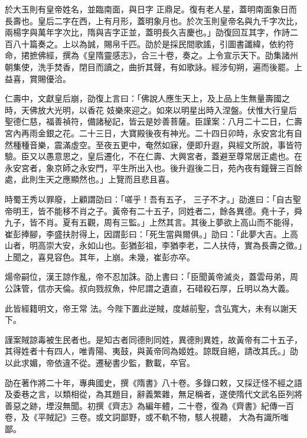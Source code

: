 \begin{pinyinscope}
 於大玉則有皇帝姓名，並臨南面，與日字
 正鼎足。復有老人星，蓋明南面象日而長壽也。皇后二字在西，上有月形，蓋明象月也。於次玉則皇帝名與九千字次比，兩楊字與萬年字次比，隋與吉字正並，蓋明長久吉慶也。」劭復回互其字，作詩二百八十篇奏之。上以為誠，賜帛千匹。劭於是採民間歌謠，引圖書讖緯，依約符命，捃摭佛經，撰為《皇隋靈感志》，合三十卷，奏之。上令宣示天下。劭集諸州朝集使，洗手焚香，閉目而讀之，曲折其聲，有如歌詠。經涉旬朔，遍而後罷。上益喜，賞賜優洽。



 仁壽中，文獻皇后崩，劭復上言曰：「佛說人應生天上，及上品上生無量壽國之時，天佛放大光明，以香花
 妓樂來迎之。如來以明星出時入涅盤。伏惟大行皇后聖德仁慈，福善禎符，備諸秘記，皆云是妙善菩薩。臣謹案：八月二十二日，仁壽宮內再雨金銀之花。二十三日，大寶殿後夜有神光。二十四日卯時，永安宮北有自然種種音樂，震滿虛空。至夜五更中，奄然如寐，便即升遐，與經文所說，事皆符驗。臣又以愚意思之，皇后遷化，不在仁壽、大興宮者，蓋避至尊常居正處也。在永安宮者，象京師之永安門，平生所出入也。後升遐後二日，苑內夜有鐘聲三百餘處，此則生天之應顯然也。」上覽而且悲且喜。



 時蜀王秀以罪廢，上顧謂劭曰：「嗟乎！吾有五子，
 三子不才。」劭進曰：「自古聖帝明王，皆不能移不肖之子。黃帝有二十五子，同姓者二，餘各異德。堯十子，舜九子，皆不肖。夏有五觀，周有三監。」上然其言。其後上夢欲上高山而不能得，崔彭捧腳，李盛扶肘得上，因謂彭曰：「死生當與爾俱。」劭曰：「此夢大吉。上高山者，明高崇大安，永如山也。彭猶彭祖，李猶李老，二人扶侍，實為長壽之徵。」上聞之，喜見容色。其年，上崩。未幾，崔彭亦卒。



 煬帝嗣位，漢王諒作亂，帝不忍加誅。劭上書曰：「臣聞黃帝滅炎，蓋雲母弟，周公誅管，信亦天倫。叔向戮叔魚，仲尼謂之遺直，石碏殺石厚，丘明以為大義。



 此皆經籍明文，帝王常
 法。今陛下置此逆賊，度越前聖，含弘寬大，未有以謝天下。



 謹案賊諒毒被生民者也。是知古者同德則同姓，異德則異姓，故黃帝有二十五子，其得姓者十有四人，唯青陽、夷鼓，與黃帝同為姬姓。諒既自絕，請改其氏。」劭以此求媚，帝依違不從。遷秘書少監，數載，卒官。



 劭在著作將二十年，專典國史，撰《隋書》八十卷。多錄口敕，又採迂怪不經之語及委巷之言，以類相從，為其題目，辭義繁雜，無足稱者，遂使隋代文武名臣列將善惡之跡，堙沒無聞。初撰《齊志》為編年體，二十卷，復為《齊書》紀傳一百卷，及《平賊記》三卷。或文詞鄙野，或不軌不物，駭人視聽，
 大為有識所嗤鄙。




\end{pinyinscope}
